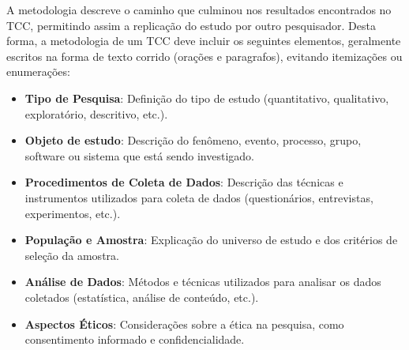 

A metodologia descreve o caminho que culminou nos resultados encontrados no TCC, permitindo assim a replicação do estudo por outro pesquisador. Desta forma, a metodologia de um TCC deve incluir os seguintes elementos, geralmente escritos na forma de texto corrido (orações e paragrafos), evitando itemizações ou enumerações:

\begin{itemize}
    \item \textbf{Tipo de Pesquisa}: Definição do tipo de estudo (quantitativo, qualitativo, exploratório, descritivo, etc.).
    \item \textbf{Objeto de estudo}: Descrição do fenômeno, evento, processo, grupo, software ou sistema que está sendo investigado.
    \item \textbf{Procedimentos de Coleta de Dados}: Descrição das técnicas e instrumentos utilizados para coleta de dados (questionários, entrevistas, experimentos, etc.).
    \item \textbf{População e Amostra}: Explicação do universo de estudo e dos critérios de seleção da amostra.
    \item \textbf{Análise de Dados}: Métodos e técnicas utilizados para analisar os dados coletados (estatística, análise de conteúdo, etc.).
    \item \textbf{Aspectos Éticos}: Considerações sobre a ética na pesquisa, como consentimento informado e confidencialidade.
\end{itemize}